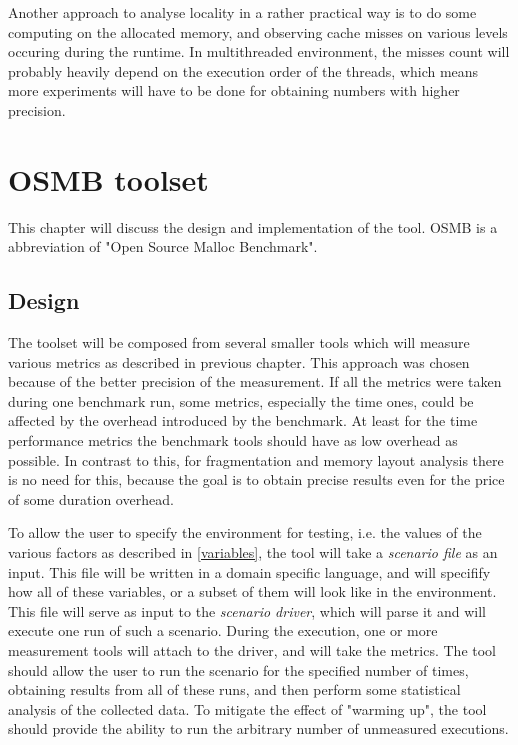 Another approach to analyse locality in a rather practical way is to do some computing on the allocated memory, and observing cache misses on various levels occuring during the runtime. In multithreaded environment, the misses count will probably heavily depend on the execution order of the threads, which means more experiments will have to be done for obtaining numbers with higher precision.

\chapter{OSMB toolset}

This chapter will discuss the design and implementation of the tool. OSMB is a abbreviation of "Open Source Malloc Benchmark".

\section{Design}

The toolset will be composed from several smaller tools which will measure various metrics as described in previous chapter. This approach was chosen because of the better precision of the measurement. If all the metrics were taken during one benchmark run, some metrics, especially the time ones, could be affected by the overhead introduced by the benchmark. At least for the time performance metrics the benchmark tools should have as low overhead as possible. In contrast to this, for fragmentation and memory layout analysis there is no need for this, because the goal is to obtain precise results even for the price of some duration overhead.

To allow the user to specify the environment for testing, i.e. the values of the various factors as described in \ref{variables}, the tool will take a {\em scenario file} as an input. This file will be written in a domain specific language, and will specifify how all of these variables, or a subset of them will look like in the environment. This file will serve as input to the {\em scenario driver}, which will parse it and will execute one run of such a scenario. During the execution, one or more measurement tools will attach to the driver, and will take the metrics. The tool should allow the user to run the scenario for the specified number of times, obtaining results from all of these runs, and then perform some statistical analysis of the collected data. To mitigate the effect of "warming up", the tool should provide the ability to run the arbitrary number of unmeasured executions.

